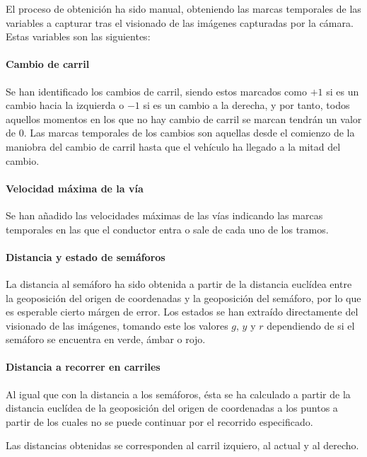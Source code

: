 El proceso de obtenición ha sido manual, obteniendo las marcas temporales de las variables a capturar tras el visionado de las imágenes capturadas por la cámara. Estas variables son las siguientes:

\paragraph{Cambio de carril}

Se han identificado los cambios de carril, siendo estos marcados como $+1$ si es un cambio hacia la izquierda o $-1$ si es un cambio a la derecha, y por tanto, todos aquellos momentos en los que no hay cambio de carril se marcan tendrán un valor de $0$. Las marcas temporales de los cambios son aquellas desde el comienzo de la maniobra del cambio de carril hasta que el vehículo ha llegado a la mitad del cambio.

\paragraph{Velocidad máxima de la vía}

Se han añadido las velocidades máximas de las vías indicando las marcas temporales en las que el conductor entra o sale de cada uno de los tramos.

\paragraph{Distancia y estado de semáforos}

La distancia al semáforo ha sido obtenida a partir de la distancia euclídea entre la geoposición del origen de coordenadas y la geoposición del semáforo, por lo que es esperable cierto márgen de error. Los estados se han extraído directamente del visionado de las imágenes, tomando este los valores $g$, $y$ y $r$ dependiendo de si el semáforo se encuentra en verde, ámbar o rojo.

\paragraph{Distancia a recorrer en carriles}

Al igual que con la distancia a los semáforos, ésta se ha calculado a partir de la distancia euclídea de la geoposición del origen de coordenadas a los puntos a partir de los cuales no se puede continuar por el recorrido especificado.

Las distancias obtenidas se corresponden al carril izquiero, al actual y al derecho.

